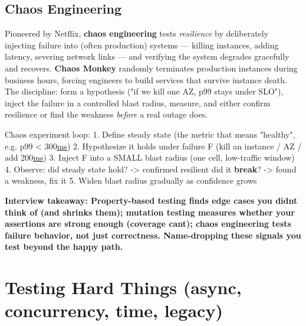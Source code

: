 \documentclass[11pt]{article}
\newenvironment{Shaded}{\begin{snugshade}}{\end{snugshade}}
\newcommand{\ControlFlowTok}[1]{\textcolor[rgb]{0.99,0.74,0.29}{\textbf{#1}}}
\newcommand{\DecValTok}[1]{\textcolor[rgb]{0.96,0.45,0.00}{#1}}
\newcommand{\ErrorTok}[1]{\textcolor[rgb]{0.85,0.27,0.33}{\underline{#1}}}
\newcommand{\FloatTok}[1]{\textcolor[rgb]{0.96,0.45,0.00}{#1}}
\newcommand{\ImportTok}[1]{\textcolor[rgb]{0.15,0.68,0.38}{#1}}
\newcommand{\NormalTok}[1]{\textcolor[rgb]{0.81,0.81,0.76}{#1}}
\newcommand{\OperatorTok}[1]{\textcolor[rgb]{0.81,0.81,0.76}{#1}}
\newcommand{\StringTok}[1]{\textcolor[rgb]{0.96,0.31,0.31}{#1}}
\begin{document}
\subsection{Chaos Engineering}\label{chaos-engineering}

Pioneered by Netflix, \textbf{chaos engineering} tests \emph{resilience} by deliberately injecting failure into (often production) systems --- killing instances, adding latency, severing network links --- and verifying the system degrades gracefully and recovers. \textbf{Chaos Monkey} randomly terminates production instances during business hours, forcing engineers to build services that survive instance death. The discipline: form a hypothesis ("if we kill one AZ, p99 stays under SLO"), inject the failure in a controlled blast radius, measure, and either confirm resilience or find the weakness \emph{before} a real outage does.


\begin{Shaded}
\begin{Highlighting}[]
\NormalTok{   Chaos experiment loop:}
   \FloatTok{1.}\NormalTok{ Define steady state (the metric that means }\StringTok{"healthy"}\NormalTok{, e.g. p99 }\OperatorTok{\textless{}} \DecValTok{300}\ErrorTok{ms}\NormalTok{)}
   \FloatTok{2.}\NormalTok{ Hypothesize it holds under failure F (kill an instance }\OperatorTok{/}\NormalTok{ AZ }\OperatorTok{/}\NormalTok{ add }\DecValTok{200}\ErrorTok{ms}\NormalTok{)}
   \FloatTok{3.}\NormalTok{ Inject F into a SMALL blast radius (one cell, low}\OperatorTok{{-}}\NormalTok{traffic window)}
   \FloatTok{4.}\NormalTok{ Observe: did steady state hold?  }\OperatorTok{{-}\textgreater{}}\NormalTok{ confirmed resilient}
\NormalTok{                did it }\ControlFlowTok{break}\NormalTok{?          }\OperatorTok{{-}\textgreater{}}\NormalTok{ found a weakness, fix it}
   \FloatTok{5.}\NormalTok{ Widen blast radius gradually }\ImportTok{as}\NormalTok{ confidence grows}
\end{Highlighting}
\end{Shaded}

\textbf{Interview takeaway: Property-based testing finds edge cases you didn\textquotesingle t think of (and shrinks them); mutation testing measures whether your assertions are strong enough (coverage can\textquotesingle t); chaos engineering tests failure behavior, not just correctness. Name-dropping these signals you test beyond the happy path.}

\section{Testing Hard Things (async, concurrency, time, legacy)}\label{testing-hard-things-async-concurrency-time-legacy}
\end{document}
